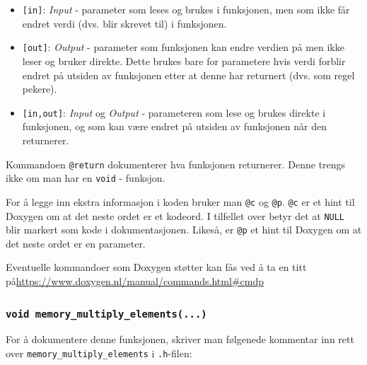 \begin{alphasection}
\begin{itemize}
    \item \verb|[in]|: \textit{Input} - parameter som leses og brukes i funksjonen, men som ikke får endret verdi (dvs. blir skrevet til) i funksjonen. 
    \item \verb|[out]|: \textit{Output} - parameter som funksjonen kan endre verdien på men ikke leser og bruker direkte. Dette brukes bare for parametere hvis verdi forblir endret på utsiden av funksjonen etter at denne har returnert (dvs. som regel pekere).
    \item \verb|[in,out]|: \textit{Input} og \textit{Output} - parameteren som lese og brukes direkte i funksjonen, og som kan være endret på utsiden av funksjonen når den returnerer.
\end{itemize}

Kommandoen \verb|@return| dokumenterer hva funksjonen returnerer. Denne trengs ikke om man har en \lstinline{void} - funksjon.

For å legge inn ekstra informasjon i koden bruker man \verb|@c| og \verb|@p|. \verb|@c| er et hint til Doxygen om at det neste ordet er et kodeord. I tilfellet over betyr det at \verb|NULL| blir markert som kode i dokumentasjonen. Likeså, er \verb|@p| et hint til Doxygen om at det neste ordet er en parameter.

Eventuelle kommandoer som Doxygen støtter kan fås ved å ta en titt på\newline \href{https://www.doxygen.nl/manual/commands.html#cmdp}{https://www.doxygen.nl/manual/commands.html\#cmdp}

\cprotect\subsubsection{\lstinline{void memory_multiply_elements(...)}}

For å dokumentere denne funksjonen, skriver man følgenede kommentar inn rett over \verb|memory_multiply_elements| i \verb|.h|-filen:



\end{alphasection}
